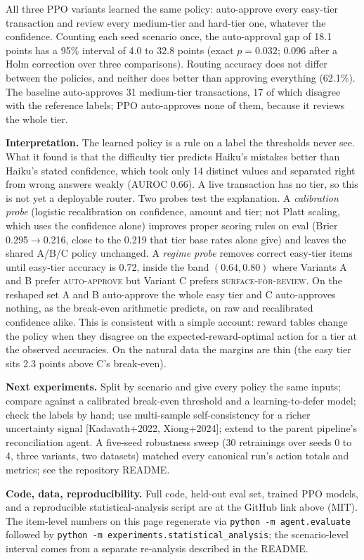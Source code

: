 \documentclass[10pt,a4paper]{article}
\begin{document}
All three PPO variants learned the same policy: auto-approve every easy-tier
transaction and review every medium-tier and hard-tier one, whatever the
confidence. Counting each seed scenario once, the auto-approval gap of 18.1
points has a 95\% interval of 4.0 to 32.8 points (exact $p = 0.032$; 0.096
after a Holm correction over three comparisons). Routing accuracy does not
differ between the policies, and neither does better than approving everything
(62.1\%). The baseline auto-approves 31 medium-tier transactions, 17 of which
disagree with the reference labels; PPO auto-approves none of them, because it
reviews the whole tier.

\textbf{Interpretation.}
The learned policy is a rule on a label the thresholds never see. What it found
is that the difficulty tier predicts Haiku's mistakes better than Haiku's
stated confidence, which took only 14 distinct values and separated right from
wrong answers weakly (AUROC 0.66). A live transaction has no tier, so this is
not yet a deployable router.
Two probes test the explanation. A \emph{calibration probe} (logistic
recalibration on confidence, amount and tier; not Platt scaling, which uses the
confidence alone) improves proper scoring rules on eval (Brier 0.295$\to$0.216,
close to the 0.219 that tier base rates alone give) and leaves the shared A/B/C
policy unchanged. A \emph{regime probe} removes correct easy-tier items until
easy-tier accuracy is 0.72, inside the band $(0.64, 0.80)$ where Variants A
and B prefer \textsc{auto-approve} but Variant C prefers
\textsc{surface-for-review}. On the reshaped set A and B auto-approve the whole
easy tier and C auto-approves nothing, as the break-even arithmetic predicts,
on raw and recalibrated confidence alike. This is consistent with a simple
account: reward tables change the policy when they disagree on the
expected-reward-optimal action for a tier at the observed accuracies. On the
natural data the margins are thin (the easy tier sits 2.3 points above C's
break-even).

\textbf{Next experiments.}
Split by scenario and give every policy the same inputs; compare against a
calibrated break-even threshold and a learning-to-defer model; check the labels
by hand; use multi-sample self-consistency for a richer uncertainty signal
[Kadavath+2022, Xiong+2024]; extend to the parent pipeline's reconciliation
agent. A five-seed robustness sweep (30 retrainings over seeds 0 to 4, three
variants, two datasets) matched every canonical run's action totals and
metrics; see the repository README.

\textbf{Code, data, reproducibility.} Full code, held-out eval set, trained PPO
models, and a reproducible statistical-analysis script are at the GitHub link
above (MIT). The item-level numbers on this page regenerate via
\texttt{python -m agent.evaluate} followed by
\texttt{python -m experiments.statistical\_analysis}; the scenario-level
interval comes from a separate re-analysis described in the README.
\end{document}
